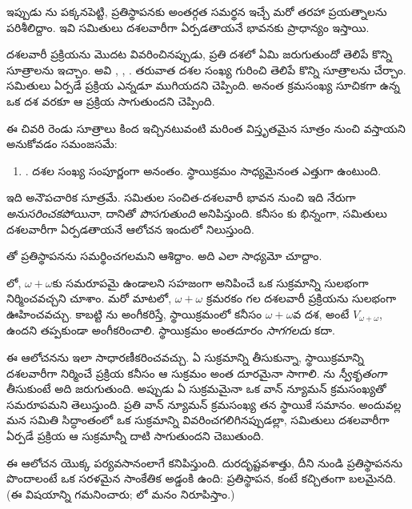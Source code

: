 \documentclass[../../../include/open-logic-section]{subfiles}
\begin{document}

ఇప్పుడు \limofsize{}ను పక్కనపెట్టి, ప్రతిస్థాపనకు
అంతర్గత సమర్థన ఇచ్చే మరో తరహా ప్రయత్నాలను పరిశీలిద్దాం.
ఇవి సమితులు దశలవారీగా ఏర్పడతాయనే భావనకు ప్రాధాన్యం ఇస్తాయి.

దశలవారీ ప్రక్రియను మొదట వివరించినప్పుడు, ప్రతి దశలో
ఏమి జరుగుతుందో తెలిపే కొన్ని సూత్రాలను ఇచ్చాం. అవి
\stageshier, \stagesord, \stagesacc. తరువాత దశల సంఖ్య
గురించి తెలిపే కొన్ని సూత్రాలను చేర్చాం. సమితులు ఏర్పడే
ప్రక్రియ ఎన్నడూ ముగియదని \stagessucc{} చెప్పింది. అనంత
క్రమసంఖ్య సూచికగా ఉన్న ఒక దశ వరకూ ఆ ప్రక్రియ సాగుతుందని
\stagesinf{} చెప్పింది.

ఈ చివరి రెండు సూత్రాలు కింద ఇచ్చినటువంటి మరింత విస్తృతమైన సూత్రం నుంచి వస్తాయని అనుకోవడం సమంజసమే:
\begin{enumerate}
	\item[] \stagesinex. దశల సంఖ్య సంపూర్ణంగా అనంతం. స్థాయిక్రమం సాధ్యమైనంత ఎత్తుగా ఉంటుంది.
\end{enumerate}
ఇది అనౌపచారిక సూత్రమే. సమితుల సంచిత-దశలవారీ భావన నుంచి
ఇది నేరుగా \emph{అనుసరించకపోయినా}, దానితో
\emph{పొసగుతుంది} అనిపిస్తుంది. కనీసం \limofsize{}కు భిన్నంగా,
సమితులు దశలవారీగా ఏర్పడతాయనే ఆలోచన ఇందులో నిలుస్తుంది.

\stagesinex{}తో ప్రతిస్థాపనను సమర్థించగలమని ఆశిద్దాం.
అది ఎలా సాధ్యమో చూద్దాం.

లో, $\omega+\omega$కు సమరూపమై ఉండాలని సహజంగా అనిపించే ఒక సుక్రమాన్ని సులభంగా నిర్మించవచ్చని చూశాం. మరో మాటలో, $\omega+\omega$ క్రమరకం గల దశలవారీ ప్రక్రియను సులభంగా ఊహించవచ్చు. కాబట్టి \stagesinex{}ను అంగీకరిస్తే, స్థాయిక్రమంలో కనీసం $\omega+\omega$వ దశ, అంటే $V_{\omega+\omega}$, ఉందని తప్పకుండా అంగీకరించాలి. స్థాయిక్రమం అంతదూరం \emph{సాగగలదు} కదా.

ఈ ఆలోచనను ఇలా సాధారణీకరించవచ్చు. ఏ సుక్రమాన్ని తీసుకున్నా,
స్థాయిక్రమాన్ని దశలవారీగా నిర్మించే ప్రక్రియ కనీసం ఆ సుక్రమం
అంత దూరమైనా సాగాలి. ను
\emph{స్వీకృతంగా} తీసుకుంటే అది జరుగుతుంది. అప్పుడు ఏ
సుక్రమమైనా ఒక వాన్ న్యూమన్ క్రమసంఖ్యతో సమరూపమని తెలుస్తుంది.
ప్రతి వాన్ న్యూమన్ క్రమసంఖ్య తన స్థాయికే సమానం. అందువల్ల
మన సమితి సిద్ధాంతంలో ఒక సుక్రమాన్ని వివరించగలిగినప్పుడల్లా,
సమితులు దశలవారీగా ఏర్పడే ప్రక్రియ ఆ సుక్రమాన్నీ దాటి
సాగుతుందని  చెబుతుంది.

ఈ ఆలోచన \stagesinex{} యొక్క పర్యవసానంలాగే కనిపిస్తుంది. దురదృష్టవశాత్తు, దీని నుండి ప్రతిస్థాపనను పొందాలంటే ఒక సరళమైన సాంకేతిక అడ్డంకి ఉంది: ప్రతిస్థాపన, కంటే కచ్చితంగా బలమైనది. (ఈ విషయాన్ని \citet[\S13.2]{Potter2004} గమనించారు; లో మనం నిరూపిస్తాం.)
\end{document}
